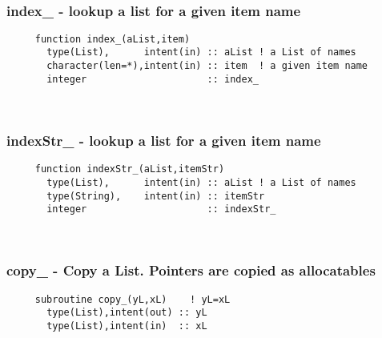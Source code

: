  
\mbox{}\hrulefill\ 
 
 \subsubsection{index\_ - lookup a list for a given item name}

\begin{verbatim} 
     function index_(aList,item)
       type(List),      intent(in) :: aList	! a List of names
       character(len=*),intent(in) :: item	! a given item name
       integer                     :: index_
 \end{verbatim} %
 
 
\mbox{}\hrulefill\ 
 

  \subsubsection{indexStr\_ - lookup a list for a given item name}

\begin{verbatim} 
     function indexStr_(aList,itemStr)
       type(List),      intent(in) :: aList	! a List of names
       type(String),    intent(in) :: itemStr
       integer                     :: indexStr_
 \end{verbatim} %
 
 
\mbox{}\hrulefill\ 
 
  \subsubsection{copy\_ - Copy a List. Pointers are copied as allocatables}

\begin{verbatim} 
     subroutine copy_(yL,xL)	! yL=xL
       type(List),intent(out) :: yL
       type(List),intent(in)  :: xL
 \end{verbatim} %
 
